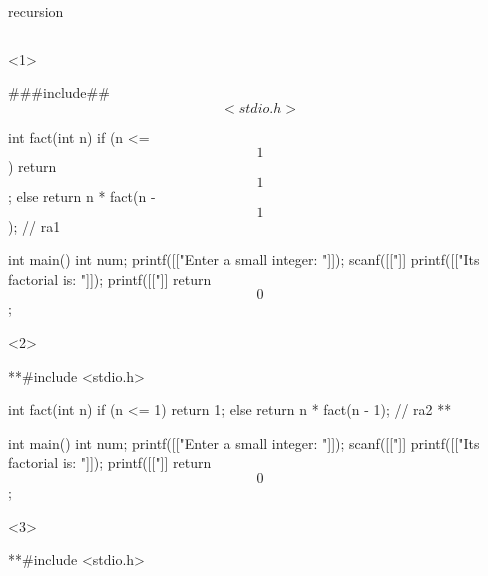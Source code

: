 \documentclass[10pt,t,svgnames]{beamer}
\begin{document}
  \begin{frame}[fragile]{recursion}
    \begin{columns}
      \begin{column}{.65\textwidth}
        \vspace{-20em} %
        \begin{scriptsize}
          \begin{onlyenv}<1>
            \begin{codeblock}[gobble=8]
              ###include## $$<stdio.h>$$

              int fact(int n) {
                if (n <= $$1$$) {
                  return $$1$$;
                }
                else {
                  return n * fact(n - $$1$$); // ra1
                }
              }

              int main() {
                int num;
                printf([["Enter a small integer: "]]);
                scanf([["]]%
                printf([["Its factorial is: "]]);
                printf([["]]%
                return $$0$$;
              }
            \end{codeblock}
          \end{onlyenv}
          \begin{onlyenv}<2>
            \begin{codeblock}[gobble=8]
              **#include <stdio.h>

              int fact(int n) {
                if (n <= 1) {
                  return 1;
                }
                else {
                  return n * fact(n - 1); // ra2
                }
              }**

              int main() {
                int num;
                printf([["Enter a small integer: "]]);
                scanf([["]]%
                printf([["Its factorial is: "]]);
                printf([["]]%
                return $$0$$;
              }
            \end{codeblock}
          \end{onlyenv}
          \begin{onlyenv}<3>
            \begin{codeblock}[gobble=8]
              **#include <stdio.h>


\end{codeblock}
\end{onlyenv}
\end{scriptsize}
\end{column}
\end{columns}
\end{frame}
\end{document}
